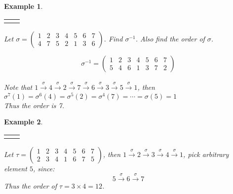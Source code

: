 \documentclass{article}
\theoremstyle{MyNonumberplain}
\theoremstyle{break}
\newcommand{\nline}{\begin{tabular}{ll}&\\\end{tabular}}
\theoremstyle{break}
\newtheorem{example}{Example}[section]
\theoremstyle{break}
\theoremstyle{definition}
\theoremstyle{break}
\begin{document}
\begin{expbox}
    \begin{example}

        \nline

        Let $\sigma = \left(\begin{array}{ccccccc}
            1 & 2 & 3 & 4 & 5 & 6 & 7\\
            4 & 7 & 5 & 2 & 1 & 3 & 6
          \end{array}\right)$. Find $\sigma^{- 1}$. Also find the order of $\sigma$.
            \begin{ansbox}
                $$\sigma^{- 1} = \left(\begin{array}{ccccccc}
                    1 & 2 & 3 & 4 & 5 & 6 & 7\\
                    5 & 4 & 6 & 1 & 3 & 7 & 2
                \end{array}\right)$$\\
                
                Note that $1 \xrightarrow{\sigma} 4 \xrightarrow{\sigma} 2
                \xrightarrow{\sigma} 7 \xrightarrow{\sigma} 6 \xrightarrow{\sigma} 3
                \xrightarrow{\sigma} 5  \xrightarrow{\sigma} 1$, then $\sigma^7 (1) = \sigma^6
                (4) = \sigma^5 (2) = \sigma^4 (7) = \cdots = \sigma (5) = 1$\\
                
                Thus the order is 7.

            \end{ansbox}



    \end{example}
\end{expbox}

\begin{expbox}
    \begin{example}

        \nline

        Let $\tau = \left(\begin{array}{ccccccc}
            1 & 2 & 3 & 4 & 5 & 6 & 7\\
            2 & 3 & 4 & 1 & 6 & 7 & 5
          \end{array}\right)$, then $1 \xrightarrow{\sigma} 2 \xrightarrow{\sigma} 3
          \xrightarrow{\sigma} 4 \xrightarrow{\sigma} 1$, pick arbitrary element $5$,
            since:
          \[ 5 \xrightarrow{\sigma} 6 \xrightarrow{\sigma} 7 \]
          Thus the order of $\tau = 3 \times 4 = 12$. 
    \end{example}
\end{expbox}
\end{document}
